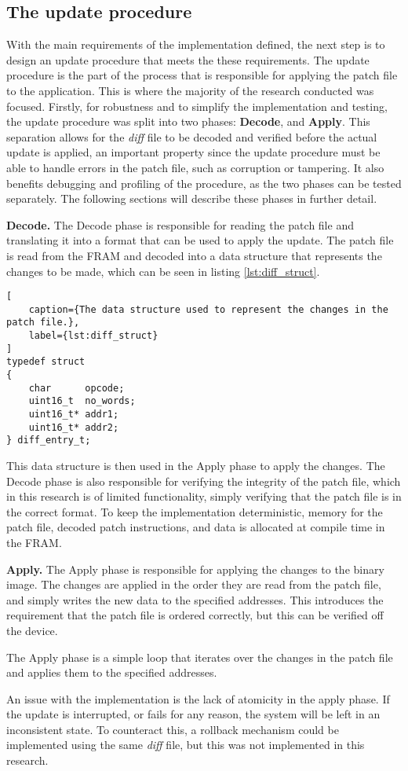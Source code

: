 \subsection{The update procedure}\label{sec:updateprocedure}
With the main requirements of the implementation defined, the next step is to design an update procedure that meets the these requirements. The update procedure is the part of the process that is responsible for applying the patch file to the application. This is where the majority of the research conducted was focused. Firstly, for robustness and to simplify the implementation and testing, the update procedure was split into two phases: \textbf{Decode}, and \textbf{Apply}. This separation allows for the \textit{diff} file to be decoded and verified before the actual update is applied, an important property since the update procedure must be able to handle errors in the patch file, such as corruption or tampering. It also benefits debugging and profiling of the procedure, as the two phases can be tested separately. The following sections will describe these phases in further detail. 

\textbf{Decode.}
The Decode phase is responsible for reading the patch file and translating it into a format that can be used to apply the update. The patch file is read from the FRAM and decoded into a data structure that represents the changes to be made, which can be seen in listing \ref{lst:diff_struct}. 
\begin{lstlisting}[
    caption={The data structure used to represent the changes in the patch file.},
    label={lst:diff_struct}
]
typedef struct  
{
    char      opcode;
    uint16_t  no_words;
    uint16_t* addr1;
    uint16_t* addr2;
} diff_entry_t;
\end{lstlisting}
This data structure is then used in the Apply phase to apply the changes. The Decode phase is also responsible for verifying the integrity of the patch file, which in this research is of limited functionality, simply verifying that the patch file is in the correct format. To keep the implementation deterministic, memory for the patch file, decoded patch instructions, and data is allocated at compile time in the FRAM.

\textbf{Apply.}
The Apply phase is responsible for applying the changes to the binary image. The changes are applied in the order they are read from the patch file, and simply writes the new data to the specified addresses. This introduces the requirement that the patch file is ordered correctly, but this can be verified off the device. 

The Apply phase is a simple loop that iterates over the changes in the patch file and applies them to the specified addresses. 

An issue with the implementation is the lack of atomicity in the apply phase. If the update is interrupted, or fails for any reason, the system will be left in an inconsistent state. To counteract this, a rollback mechanism could be implemented using the same \textit{diff} file, but this was not implemented in this research. 
